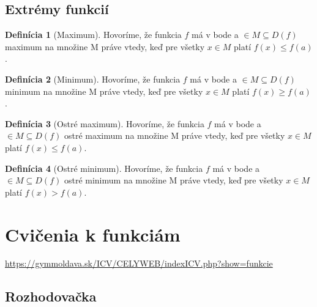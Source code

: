 \documentclass[12pt, twopage]{article}
\theoremstyle{definition}
\newtheorem{definition}{Definícia}
\begin{document}
 	\subsection{Extrémy funkcií}
 	
 	\begin{definition}[Maximum]
 		Hovoríme, že funkcia $f$ má v bode a $\in M \subseteq D(f)$ maximum na množine M práve vtedy, keď pre všetky $x \in M$ platí $f(x) \le f(a)$.
 	\end{definition}
 	
 	\begin{definition}[Minimum]
 		Hovoríme, že funkcia $f$ má v bode a $\in M \subseteq D(f)$ minimum na množine M práve vtedy, keď pre všetky $x \in M$ platí $f(x) \ge f(a)$.
 	\end{definition}
 	
 	\begin{definition}[Ostré maximum]
 		Hovoríme, že funkcia $f$ má v bode a $\in M \subseteq D(f)$ ostré maximum na množine M práve vtedy, keď pre všetky $x \in M$ platí $f(x) \le f(a)$.
 	\end{definition}
 	
 	\begin{definition}[Ostré minimum]
 		Hovoríme, že funkcia $f$ má v bode a $\in M \subseteq D(f)$ ostré minimum na množine M práve vtedy, keď pre všetky $x \in M$ platí $f(x) > f(a)$.
 	\end{definition}
 	
	
	\section{Cvičenia k funkciám}
	
	\url{https://gymmoldava.sk/ICV/CELYWEB/indexICV.php?show=funkcie}
	
	\subsection{Rozhodovačka}
	
\end{document}
